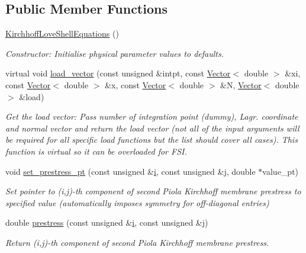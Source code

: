 \subsection*{Public Member Functions}
\begin{DoxyCompactItemize}
\item 
\hyperlink{classoomph_1_1KirchhoffLoveShellEquations_a4d3fc7a2533f590a243323c7bf9c1320}{Kirchhoff\+Love\+Shell\+Equations} ()
\begin{DoxyCompactList}\small\item\em Constructor\+: Initialise physical parameter values to defaults. \end{DoxyCompactList}\item 
virtual void \hyperlink{classoomph_1_1KirchhoffLoveShellEquations_ad404001c9a8c9587ece41bc4ff8c1ce1}{load\+\_\+vector} (const unsigned \&intpt, const \hyperlink{classoomph_1_1Vector}{Vector}$<$ double $>$ \&xi, const \hyperlink{classoomph_1_1Vector}{Vector}$<$ double $>$ \&x, const \hyperlink{classoomph_1_1Vector}{Vector}$<$ double $>$ \&N, \hyperlink{classoomph_1_1Vector}{Vector}$<$ double $>$ \&load)
\begin{DoxyCompactList}\small\item\em Get the load vector\+: Pass number of integration point (dummy), Lagr. coordinate and normal vector and return the load vector (not all of the input arguments will be required for all specific load functions but the list should cover all cases). This function is virtual so it can be overloaded for F\+SI. \end{DoxyCompactList}\item 
void \hyperlink{classoomph_1_1KirchhoffLoveShellEquations_abbe7f5f484c4baa0b5859e46aa5e587a}{set\+\_\+prestress\+\_\+pt} (const unsigned \&\hyperlink{cfortran_8h_adb50e893b86b3e55e751a42eab3cba82}{i}, const unsigned \&j, double $\ast$value\+\_\+pt)
\begin{DoxyCompactList}\small\item\em Set pointer to (i,j)-\/th component of second Piola Kirchhoff membrane prestress to specified value (automatically imposes symmetry for off-\/diagonal entries) \end{DoxyCompactList}\item 
double \hyperlink{classoomph_1_1KirchhoffLoveShellEquations_a5e088d691fff72ff1bce3e528d245018}{prestress} (const unsigned \&\hyperlink{cfortran_8h_adb50e893b86b3e55e751a42eab3cba82}{i}, const unsigned \&j)
\begin{DoxyCompactList}\small\item\em Return (i,j)-\/th component of second Piola Kirchhoff membrane prestress. \end{DoxyCompactList}\item 

\end{DoxyCompactItemize}
